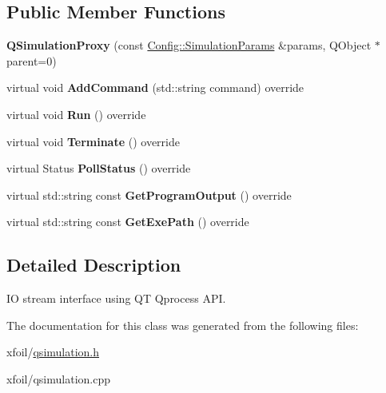 \subsection*{Public Member Functions}
\begin{DoxyCompactItemize}
\item 
\hypertarget{class_q_simulation_proxy_a10836d0c32979096e2f717fc52fe9cfe}{}\label{class_q_simulation_proxy_a10836d0c32979096e2f717fc52fe9cfe} 
{\bfseries Q\+Simulation\+Proxy} (const \hyperlink{struct_config_1_1_simulation_params}{Config\+::\+Simulation\+Params} \&params, Q\+Object $\ast$parent=0)
\item 
\hypertarget{class_q_simulation_proxy_ac2ec0d6fcbb367a09215fa74a0e07097}{}\label{class_q_simulation_proxy_ac2ec0d6fcbb367a09215fa74a0e07097} 
virtual void {\bfseries Add\+Command} (std\+::string command) override
\item 
\hypertarget{class_q_simulation_proxy_accbf718d10c3d97bc969d40041079a2e}{}\label{class_q_simulation_proxy_accbf718d10c3d97bc969d40041079a2e} 
virtual void {\bfseries Run} () override
\item 
\hypertarget{class_q_simulation_proxy_aef1ca5b3fa662109c5f45e0b277df2db}{}\label{class_q_simulation_proxy_aef1ca5b3fa662109c5f45e0b277df2db} 
virtual void {\bfseries Terminate} () override
\item 
\hypertarget{class_q_simulation_proxy_aae992d752c79bca078612afb918a0683}{}\label{class_q_simulation_proxy_aae992d752c79bca078612afb918a0683} 
virtual Status {\bfseries Poll\+Status} () override
\item 
\hypertarget{class_q_simulation_proxy_ab8be04fedafdc3f9924703dafb68611b}{}\label{class_q_simulation_proxy_ab8be04fedafdc3f9924703dafb68611b} 
virtual std\+::string const {\bfseries Get\+Program\+Output} () override
\item 
\hypertarget{class_q_simulation_proxy_a51336e36115ed18a9b78aba8fdabe4db}{}\label{class_q_simulation_proxy_a51336e36115ed18a9b78aba8fdabe4db} 
virtual std\+::string const {\bfseries Get\+Exe\+Path} () override
\end{DoxyCompactItemize}


\subsection{Detailed Description}
IO stream interface using QT Qprocess A\+PI. 

The documentation for this class was generated from the following files\+:\begin{DoxyCompactItemize}
\item 
xfoil/\hyperlink{qsimulation_8h}{qsimulation.\+h}\item 
xfoil/qsimulation.\+cpp\end{DoxyCompactItemize}

